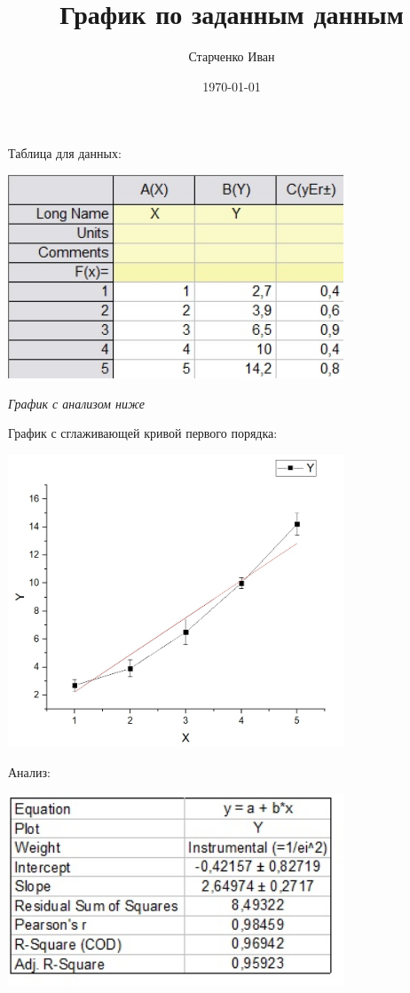 \documentclass[12pt,a5paper,fleqn]{article}
\author{Старченко Иван}
\title{График по заданным данным}
\date{\today}
\begin{document}
\maketitle
\newpage

Таблица для данных:
\begin{center}
\includegraphics[width=10cm]{4}
\end{center}

\textit{График с анализом ниже}

\newpage

График с сглаживающей кривой первого порядка:
\begin{center}
\includegraphics[width=10cm]{1}
\end{center}

Анализ:
\begin{center}
\includegraphics[width=10cm]{5}
\end{center}
\end{document}
